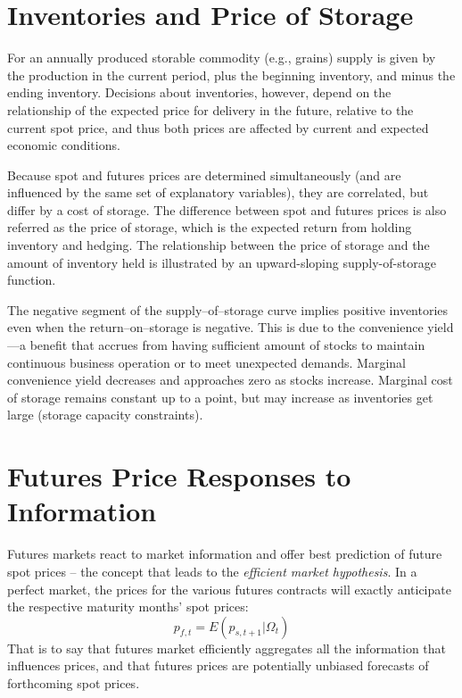 \documentclass[
]{book}
\begin{document}
\hypertarget{inventories-and-price-of-storage}{%
\section{Inventories and Price of Storage}\label{inventories-and-price-of-storage}}

For an annually produced storable commodity (e.g., grains) supply is given by the production in the current period, plus the beginning inventory, and minus the ending inventory. Decisions about inventories, however, depend on the relationship of the expected price for delivery in the future, relative to the current spot price, and thus both prices are affected by current and expected economic conditions.

Because spot and futures prices are determined simultaneously (and are influenced by the same set of explanatory variables), they are correlated, but differ by a cost of storage. The difference between spot and futures prices is also referred as the price of storage, which is the expected return from holding inventory and hedging. The relationship between the price of storage and the amount of inventory held is illustrated by an upward-sloping supply-of-storage function.

The negative segment of the supply--of--storage curve implies positive inventories even when the return--on--storage is negative. This is due to the convenience yield---a benefit that accrues from having sufficient amount of stocks to maintain continuous business operation or to meet unexpected demands. Marginal convenience yield decreases and approaches zero as stocks increase. Marginal cost of storage remains constant up to a point, but may increase as inventories get large (storage capacity constraints).

\hypertarget{futures-price-responses-to-information}{%
\section{Futures Price Responses to Information}\label{futures-price-responses-to-information}}

Futures markets react to market information and offer best prediction of future spot prices -- the concept that leads to the \emph{efficient market hypothesis}. In a perfect market, the prices for the various futures contracts will exactly anticipate the respective maturity months' spot prices: \[p_{f,t} = E\!\left(p_{s,t+1}|\Omega_t\right)\] That is to say that futures market efficiently aggregates all the information that influences prices, and that futures prices are potentially unbiased forecasts of forthcoming spot prices.
\end{document}
